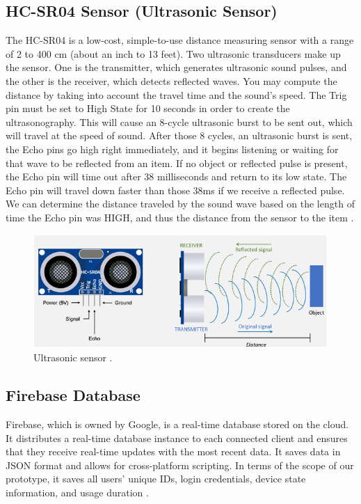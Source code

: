 \subsection{HC-SR04 Sensor (Ultrasonic Sensor)}
The HC-SR04 is a low-cost, simple-to-use distance measuring sensor with a range of 2 to 400 cm (about an inch to 13 feet). Two ultrasonic transducers make up the sensor. One is the transmitter, which generates ultrasonic sound pulses, and the other is the receiver, which detects reflected waves. You may compute the distance by taking into account the travel time and the sound's speed. The Trig pin must be set to High State for 10 seconds in order to create the ultrasonography. This will cause an 8-cycle ultrasonic burst to be sent out, which will travel at the speed of sound. After those 8 cycles, an ultrasonic burst is sent, the Echo pins go high right immediately, and it begins listening or waiting for that wave to be reflected from an item. If no object or reflected pulse is present, the Echo pin will time out after 38 milliseconds and return to its low state. The Echo pin will travel down faster than those 38ms if we receive a reflected pulse. We can determine the distance traveled by the sound wave based on the length of time the Echo pin was HIGH, and thus the distance from the sensor to the item \cite{Dimitrov2016}.
\begin{figure}[htp]
    \centering
    \includegraphics[width=12cm]{image/ultrasonic_sensor.png}
    \caption{Ultrasonic sensor \cite{ultrasonicIMG}.}
    \label{fig:ultrasonic}
\end{figure}

\subsection{Firebase Database}
Firebase, which is owned by Google, is a real-time database stored on the cloud. It distributes a real-time database instance to each connected client and ensures that they receive real-time updates with the most recent data. It saves data in JSON format and allows for cross-platform scripting. In terms of the scope of our prototype, it saves all users' unique IDs, login credentials, device state information, and usage duration \cite{Moroney2017}.

